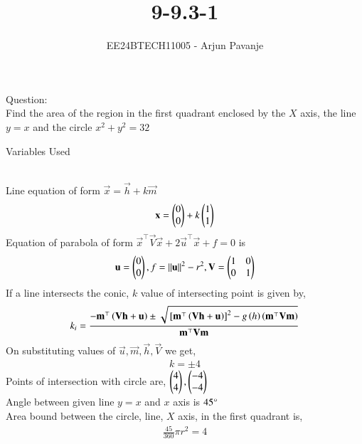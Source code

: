 \documentclass[journal]{IEEEtran}
\begin{document}

\vspace{3cm}
	
\title{9-9.3-1}
\author{EE24BTECH11005 - Arjun Pavanje}
{\let\newpage\relax\maketitle}
Question:\\
Find the area of the region in the first quadrant enclosed by the $X$ axis, the line $y=x$ and the circle $x^2+y^2=32$
\begin{table}[h!]    
  \centering
  
  \caption{Variables Used}
  \label{tab1-1.9-6}
\end{table}\\
\solution
Line equation of form $\vec{x}=\vec{h}+k\vec{m}$
\begin{align}
\mathbf{x}=\begin{pmatrix}0\\0\end{pmatrix}+k\begin{pmatrix}1\\1\end{pmatrix}
\end{align}
Equation of parabola of form $\vec{x}^{\top}\vec{V}\vec{x}+2\vec{u}^{\top}\vec{x}+f=0$ is
\begin{align}
	\mathbf{u}=\begin{pmatrix}0\\0\end{pmatrix},f=\left\lVert\mathbf{u}\right\rVert^2-r^2,\mathbf{V}=\begin{pmatrix}1&0\\0&1\end{pmatrix}
\end{align}
If a line intersects the conic, $k$ value of intersecting point is given by,
\begin{align}
	k_i=\frac{-\mathbf{m}^{\top}\left(\mathbf{Vh}+\mathbf{u}\right)\pm\sqrt{{}\left[\mathbf{m}^{\top}\left(\mathbf{Vh}+\mathbf{u}\right)\right]^2-g\left(h\right)\left(\mathbf{m}^{\top}\mathbf{Vm}\right)}}{\mathbf{m}^{\top}\mathbf{Vm}}
\end{align}
On substituting values of $\vec{u},\vec{m},\vec{h},\vec{V}$ we get,
\begin{align}
	k=\pm4
\end{align}
Points of intersection with circle are, $\begin{pmatrix}4\\4\end{pmatrix},\begin{pmatrix}-4\\-4\end{pmatrix}$\\
Angle between given line $y=x$ and $x$ axis is $45\degree$ \\
Area bound between the circle, line, $X$ axis, in the first quadrant is,
\begin{align}
	\frac{45}{360}\pi r^2
	=4
\end{align}
\end{document}
